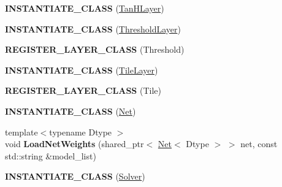 \begin{DoxyCompactItemize}
\item 
{\bfseries I\+N\+S\+T\+A\+N\+T\+I\+A\+T\+E\+\_\+\+C\+L\+A\+SS} (\hyperlink{classcaffe_1_1TanHLayer}{Tan\+H\+Layer})\hypertarget{namespacecaffe_a51e7e7c425ce80cbaec01110d4d7e914}{}\label{namespacecaffe_a51e7e7c425ce80cbaec01110d4d7e914}

\item 
{\bfseries I\+N\+S\+T\+A\+N\+T\+I\+A\+T\+E\+\_\+\+C\+L\+A\+SS} (\hyperlink{classcaffe_1_1ThresholdLayer}{Threshold\+Layer})\hypertarget{namespacecaffe_a9487decd4c03d6172ca8bdbeccf44c24}{}\label{namespacecaffe_a9487decd4c03d6172ca8bdbeccf44c24}

\item 
{\bfseries R\+E\+G\+I\+S\+T\+E\+R\+\_\+\+L\+A\+Y\+E\+R\+\_\+\+C\+L\+A\+SS} (Threshold)\hypertarget{namespacecaffe_ae425614c734e0dbeaaffcee36d24dadf}{}\label{namespacecaffe_ae425614c734e0dbeaaffcee36d24dadf}

\item 
{\bfseries I\+N\+S\+T\+A\+N\+T\+I\+A\+T\+E\+\_\+\+C\+L\+A\+SS} (\hyperlink{classcaffe_1_1TileLayer}{Tile\+Layer})\hypertarget{namespacecaffe_a357afca83e3c67f2ccc7402bd4b97353}{}\label{namespacecaffe_a357afca83e3c67f2ccc7402bd4b97353}

\item 
{\bfseries R\+E\+G\+I\+S\+T\+E\+R\+\_\+\+L\+A\+Y\+E\+R\+\_\+\+C\+L\+A\+SS} (Tile)\hypertarget{namespacecaffe_a6236555220de28c43c8064b5ce1d0db4}{}\label{namespacecaffe_a6236555220de28c43c8064b5ce1d0db4}

\item 
{\bfseries I\+N\+S\+T\+A\+N\+T\+I\+A\+T\+E\+\_\+\+C\+L\+A\+SS} (\hyperlink{classcaffe_1_1Net}{Net})\hypertarget{namespacecaffe_af8030f9a1ee4f018561a42359c365da9}{}\label{namespacecaffe_af8030f9a1ee4f018561a42359c365da9}

\item 
{\footnotesize template$<$typename Dtype $>$ }\\void {\bfseries Load\+Net\+Weights} (shared\+\_\+ptr$<$ \hyperlink{classcaffe_1_1Net}{Net}$<$ Dtype $>$ $>$ net, const std\+::string \&model\+\_\+list)\hypertarget{namespacecaffe_a810a81d45774b0f5ff238396a9a5ca8c}{}\label{namespacecaffe_a810a81d45774b0f5ff238396a9a5ca8c}

\item 
{\bfseries I\+N\+S\+T\+A\+N\+T\+I\+A\+T\+E\+\_\+\+C\+L\+A\+SS} (\hyperlink{classcaffe_1_1Solver}{Solver})\hypertarget{namespacecaffe_a76fd1ebc28ae6ed213991bcfbbc2d25c}{}\label{namespacecaffe_a76fd1ebc28ae6ed213991bcfbbc2d25c}


\end{DoxyCompactItemize}
